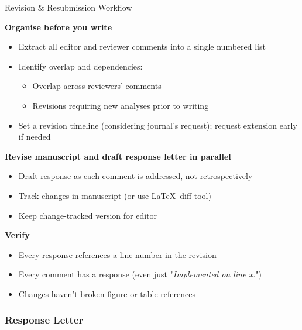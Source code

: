\documentclass{beamer}
\begin{document}
\begin{frame}{Revision \& Resubmission Workflow}

  \footnotesize
  \textbf{Organise before you write}
  \begin{itemize}
    \item Extract all editor and reviewer comments into a
      single numbered list
    \item Identify overlap and dependencies: 
      \begin{itemize}
        \scriptsize
        \item Overlap across reviewers' comments
        \item Revisions requiring new analyses prior to writing 
      \end{itemize}
    \item Set a revision timeline (considering journal's request); 
    request extension early if needed
  \end{itemize}

  \medskip
  \textbf{Revise manuscript and draft response letter in parallel}
  \begin{itemize}
    \item Draft response as each comment is addressed, not retrospectively
    \item Track changes in manuscript (or use \LaTeX\ diff tool)
    \item Keep change-tracked version for editor
  \end{itemize}

  \medskip
  \textbf{Verify}
  \begin{itemize}
    \item Every response references a line number in the revision
    \item Every comment has a response {\scriptsize (even just "\textit{Implemented on line x.}")}
    \item Changes haven't broken figure or table references
  \end{itemize}

\end{frame}



\subsubsection{Response Letter}
\end{document}
